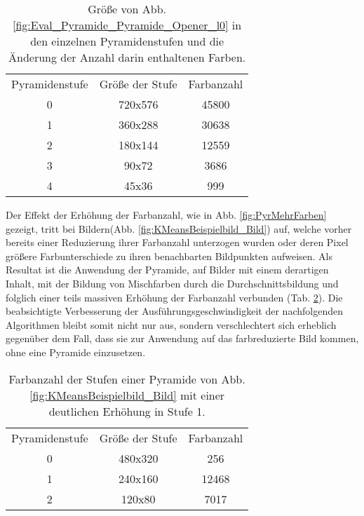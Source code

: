   \begin{table}
    \begin{center}
      \begin{tabular}{ccc}
        Pyramidenstufe & Größe der Stufe & Farbanzahl\\
        0 &	720x576	&	45800\\
        1 &	360x288	&	30638\\
        2 &	180x144	&	12559\\
        3 &	90x72	&	3686\\
        4 &	45x36	&	999
      \end{tabular}
    \end{center}
    \caption{Größe von Abb. \ref{fig:Eval_Pyramide_Pyramide_Opener_l0} in den einzelnen Pyramidenstufen und die Änderung der Anzahl darin enthaltenen Farben.}
    \label{table:TabFarbenWeniger}
  \end{table}

  \noindent Der Effekt der Erhöhung der Farbanzahl, wie in Abb. \ref{fig:PyrMehrFarben} gezeigt, tritt bei Bildern\linebreak (Abb. \ref{fig:KMeansBeispielbild_Bild}) auf, welche vorher bereits einer Reduzierung ihrer Farbanzahl unter\-zogen wurden oder deren Pixel größere Farbunterschiede zu ihren benachbarten Bildpunkten aufweisen.
  Als Resultat ist die Anwendung der Pyramide, auf Bilder mit einem derartigen Inhalt, mit der Bildung von Mischfarben durch die Durchschnittsbildung und folglich einer teils massiven Erhöhung der Farbanzahl verbunden (Tab. \ref{table:TabFarbenMehr}). Die beabsichtigte Verbesserung der Ausführungsgeschwindigkeit der nachfolgenden Algorithmen bleibt somit nicht nur aus, sondern verschlechtert sich erheblich gegenüber dem Fall, dass sie zur Anwendung auf das farbreduzierte Bild kommen, ohne eine Pyramide einzusetzen.

  \begin{table}
    \begin{center}
      \begin{tabular}{ccc}
        Pyramidenstufe & Größe der Stufe & Farbanzahl\\
        0	&	480x320	&	256\\
        1	&	240x160	&	12468\\
        2	&	120x80	&	7017
      \end{tabular}
    \end{center}
    \caption{Farbanzahl der Stufen einer Pyramide von Abb. \ref{fig:KMeansBeispielbild_Bild} mit einer deutlichen Erhöhung in Stufe 1.}
    \label{table:TabFarbenMehr}
  \end{table}

